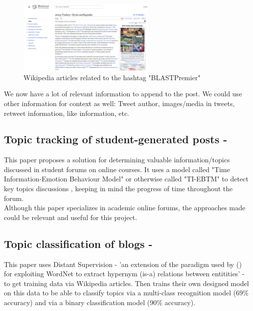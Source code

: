 \begin{figure}[htbp]
    \centering
    \includegraphics[width=0.6\textwidth]{../images/post-context-example.png}
    \caption{Wikipedia articles related to the hashtag "BLASTPremier"}
    \label{fig:blastpremier}
\end{figure}

We now have a lot of relevant information to append to the post. We could use other information for context as well: Tweet author,
images/media in tweets, retweet information, like information, etc.

\subsection{Topic tracking of student-generated posts - \cite{TopicTracking}}
This paper proposes a solution for determining valuable information/topics discussed in student forums on online courses.
It uses a model called "Time Information-Emotion Behaviour Model" or otherwise called "TI-EBTM" to detect key topics discussions
, keeping in mind the progress of time throughout the forum.\\
Although this paper specializes in academic online forums, the approaches made could be relevant and useful for this project.

\subsection{Topic classification of blogs - \cite{husby2012topic}}
This paper uses Distant Supervision - 'an extension of the paradigm used by (\cite{snow}) for exploiting WordNet to extract hypernym (is-a) relations between entitities'
- to get training data via Wikipedia articles. Then trains their own designed model on this data to be able to classify topics via a
multi-class recognition model (69\% accuracy) and via a binary classification model (90\% accuracy).

